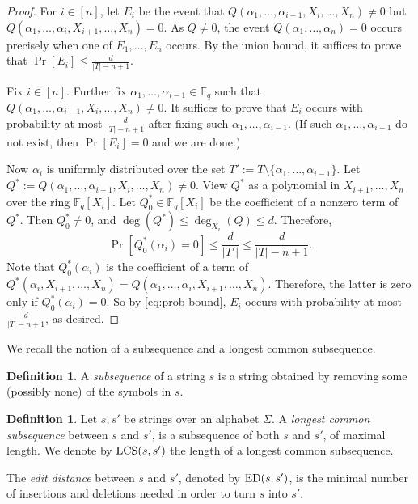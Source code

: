 \documentclass[11pt]{article}
\theoremstyle{plain}
\theoremstyle{definition}
\newtheorem{defn}[thm]{Definition}
\theoremstyle{remark}
\newcommand{\ed}[2]{\textup{ED}(#1, #2)}
\newcommand{\Fq}{\mathbb{F}_q}
\begin{document}
\begin{proof}
For $i\in [n]$, let $E_i$ be the event that 
$Q(\alpha_1,\dots,\alpha_{i-1},X_i,\dots,X_n)\neq 0$ but
$Q(\alpha_1,\dots,\alpha_i,X_{i+1},\dots,X_n)=0$.
As $Q\neq 0$, the event $Q(\alpha_1,\dots,\alpha_n)=0$ occurs precisely when one of $E_1,\dots,E_n$ occurs. By the union bound, it suffices to prove that $\Pr[E_i]\leq \frac{d}{|T|-n+1}$.

Fix $i\in [n]$. Further fix $\alpha_1,\dots,\alpha_{i-1}\in\Fq$ such that $Q(\alpha_1,\dots,\alpha_{i-1},X_i,\dots,X_n)\neq 0$.
It suffices to prove that $E_i$ occurs with probability at most $\frac{d}{|T|-n+1}$ after fixing such $\alpha_1,\dots,\alpha_{i-1}$.
(If such $\alpha_1,\dots,\alpha_{i-1}$ do not exist, then $\Pr[E_i]=0$ and we are done.)


Now $\alpha_i$ is uniformly distributed over the set $T':=T\setminus\{\alpha_1,\dots,\alpha_{i-1}\}$.
Let $Q^*:=Q(\alpha_1,\dots,\alpha_{i-1},X_i,\dots,X_n)\neq 0$.
View $Q^*$ as a polynomial in $X_{i+1},\dots,X_n$ over the ring $\Fq[X_i]$. Let $Q^*_0\in\Fq[X_i]$ be the coefficient of a nonzero term of $Q^*$.
Then $Q^*_0\neq 0$, and $\deg(Q^*)\leq \deg_{X_i}(Q)\leq d$.
Therefore,
\begin{equation}\label{eq:prob-bound}
\Pr[Q^*_0(\alpha_i)=0]\leq \frac{d}{|T'|}\leq \frac{d}{|T|-n+1}.
\end{equation}
Note that $Q^*_0(\alpha_i)$ is the coefficient of a term of $Q^*(\alpha_i,X_{i+1},\dots,X_n)=Q(\alpha_1,\dots,\alpha_i,X_{i+1},\dots,X_n)$.
Therefore, the latter is zero only if $Q_0^*(\alpha_i)=0$. So by \eqref{eq:prob-bound}, $E_i$ occurs with probability at most $\frac{d}{|T|-n+1}$, as desired.
\end{proof}

We recall the notion of a subsequence and a longest common subsequence. 
\begin{defn}
        A \emph{subsequence} of a string $s$ is a string obtained by removing some (possibly none) of the symbols in $s$. 
\end{defn}
	\begin{defn}
	
		Let $s,s'$ be strings over an alphabet $\Sigma$. 
		A \emph{longest common subsequence} between $s$ and $s'$, is a subsequence of both $s$ and $s'$, of maximal length. We denote by $ \textup{LCS}(s,s')$ the length of a longest common subsequence.
		
	The \emph{edit distance} between $s$ and $s'$, denoted by $\ed{s}{s'}$, is the minimal number of insertions and deletions needed in order to turn $s$ into $s'$. 
\end{defn}
\end{document}
